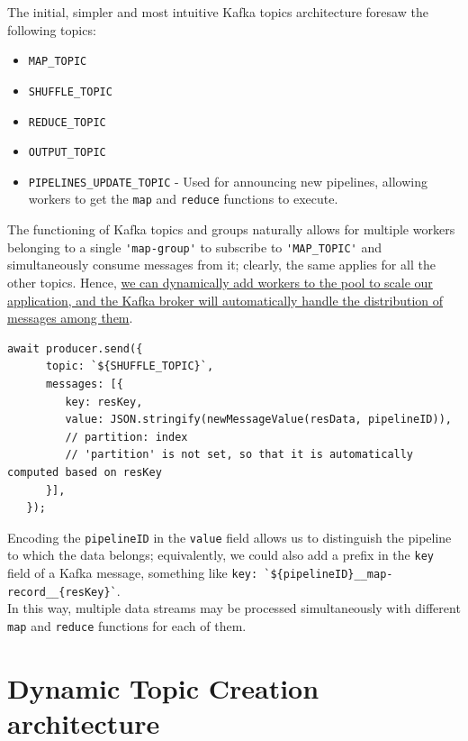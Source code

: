{The initial, simpler and most intuitive Kafka topics architecture foresaw the following topics:\ns
\begin{itemize}
   \label{enum:simplerTopics}
   \item \lstinline|MAP_TOPIC|
   \item \lstinline|SHUFFLE_TOPIC|
   \item \lstinline|REDUCE_TOPIC|
   \item \lstinline|OUTPUT_TOPIC|
   \item \lstinline|PIPELINES_UPDATE_TOPIC| - Used for announcing new pipelines, allowing workers to get the \lstinline|map| and \lstinline|reduce| functions to execute.
\end{itemize}}

The functioning of Kafka topics and groups naturally allows for multiple workers belonging to a single \lstinline|'map-group'| to subscribe to \lstinline|'MAP_TOPIC'| and simultaneously consume messages from it; clearly, the same applies for all the other topics. 
Hence, \ul{we can dynamically add workers to the pool to scale our application, and the Kafka broker will automatically handle the distribution of messages among them}.

\begin{lstlisting}[caption={Sending MAP record to shuffle topic},label={lst:sendingMapRecord}]
   await producer.send({
      topic: `${SHUFFLE_TOPIC}`,
      messages: [{
         key: resKey,
         value: JSON.stringify(newMessageValue(resData, pipelineID)),
         // partition: index
         // 'partition' is not set, so that it is automatically computed based on resKey 
      }],
   });
\end{lstlisting}
Encoding the \lstinline|pipelineID| in the \lstinline|value| field allows us to distinguish the pipeline to which the data belongs; equivalently, we could also add a prefix in the \texttt{key} field of a Kafka message, something like \lstinline|key: `${pipelineID}__map-record__{resKey}`|.\\
In this way, multiple data streams may be processed simultaneously with different \lstinline|map| and \lstinline|reduce| functions for each of them.


\section{Dynamic Topic Creation architecture}
